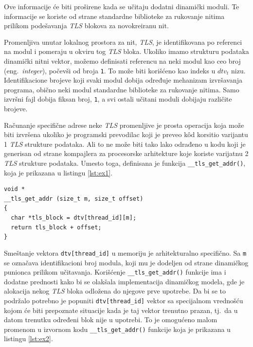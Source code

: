 \documentclass[12pt,oneside]{memoir}
\begin{document}
Ove informacije će biti proširene kada se učitaju dodatni dinamički moduli. Te informacije se koriste od strane standardne biblioteke za rukovanje nitima prilikom podešavanja \emph{TLS} blokova za novokreiranu nit.

Promenljiva unutar lokalnog prostora za nit, \emph{TLS}, je identifikovana po referenci na modul i pomeraju u okviru tog \emph{TLS} bloka. Ukoliko imamo strukturu podataka dinamički nitni vektor, možemo definisati referencu na neki modul kao ceo broj (eng.~\emph{integer}), počevši od broja \texttt{1}. To može biti korišćeno kao indeks u \texttt{$dtv_t$} nizu. Identifikacione brojeve koji svaki modul dobija određuje mehanizam izvršavanja programa, obično neki modul standardne biblioteke za rukovanje nitima. Samo izvršni fajl dobija fiksan broj, \texttt{1}, a svi ostali učitani moduli dobijaju različite brojeve.

Računanje specifične adrese neke \emph{TLS} promenljive je prosta operacija koja može biti izvršena ukoliko je programski prevodilac koji je preveo k\^{o}d korsitio varijantu 1 \emph{TLS} strukture podataka. Ali to ne može biti tako lako odrađeno u kodu koji je generisan od strane kompajlera za procesorske arhitekture koje koriste varijatnu 2 \emph{TLS} strukture podataka.
Umesto toga, definisana je funkcija \texttt{\_\_tls\_get\_addr()}, koja je prikazana u listingu \ref{lst:ex1}.\newpage

\begin{lstlisting}[style=customc, label={lst:ex1}, caption={Implementacija funkcije \texttt{\_\_tls\_get\_addr()}}]
void *
__tls_get_addr (size_t m, size_t offset)
{
  char *tls_block = dtv[thread_id][m];
  return tls_block + offset;
}

\end{lstlisting}

Smeštanje vektora \texttt{dtv[thread\_id]} u memoriju je arhitekturalno specifično. Sa \texttt{m} se označava identifikacioni broj modula, koji mu je dodeljen od strane dinamičkog punionca prilikom učitavanja. Korišćenje \texttt{\_\_tls\_get\_addr()} funkcije ima i dodatne prednosti kako bi se olakšala implementacija dinamičkog modela, gde je alokacija nekog \emph{TLS} bloka odložena do njegove prve upotrebe. Da bi se to podržalo potrebno je popuniti \texttt{dtv[thread\_id]} vektor sa specijalnom vrednošću kojom će biti prepoznate situacije kada je taj vektor trenutno prazan, tj.~da u datom trenutku određeni blok nije u upotrebi. To je omogućeno malom promenom u izvornom kodu \texttt{\_\_tls\_get\_addr()} funkcije koja je prikazana u listingu \ref{lst:ex2}.
\end{document}
